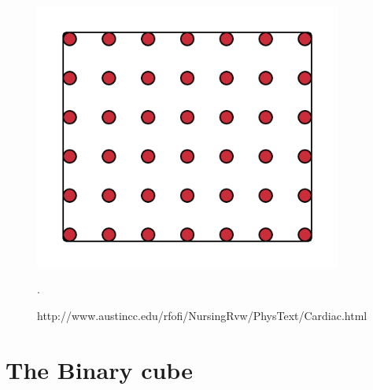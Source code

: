 \begin{figure}[h]
 \centering 
     \includegraphics[width=0.9\textwidth]{bilder/m_grid_points}
     \caption{http://www.austincc.edu/rfofi/NursingRvw/PhysText/Cardiac.html}.
     \label{m_grid_points.png}
\end{figure}

\section{The Binary cube}





